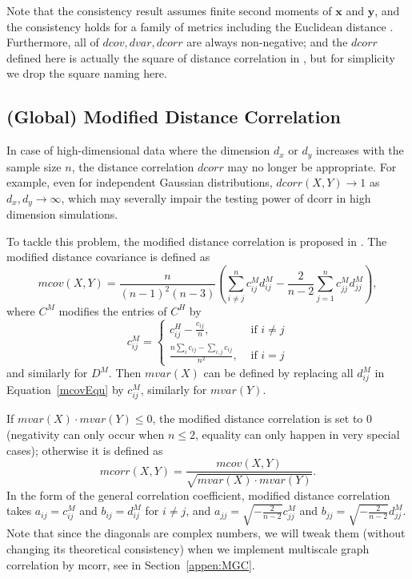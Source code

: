 \documentclass[11pt]{article}
\providecommand{\mb}[1]{\boldsymbol{#1}}
\begin{document}
Note that the consistency result assumes finite second moments of $\mb{x}$ and $\mb{y}$, and the consistency holds for a family of metrics including the Euclidean distance \cite{Lyons2013}. Furthermore, all of $dcov, dvar, dcorr$ are always non-negative; and the $dcorr$ defined here is actually the square of distance correlation in \cite{SzekelyRizzoBakirov2007}, but for simplicity we drop the square naming here.

\subsection{(Global) Modified Distance Correlation}
\label{appen:mcorr}
In case of high-dimensional data where the dimension $d_{x}$ or $d_{y}$ increases with the sample size $n$, the distance correlation $dcorr$ may no longer be appropriate. For example, even for independent Gaussian distributions, $dcorr(X,Y) \rightarrow 1$ as $d_{x}, d_{y} \rightarrow \infty$, which may severally impair the testing power of dcorr in high dimension simulations.

To tackle this problem, the modified distance correlation is proposed in \cite{SzekelyRizzo2013a}. The modified distance covariance is defined as
\begin{equation}
\label{mcovEqu}
mcov(X,Y)=\frac{n}{(n-1)^2(n-3)}(\sum_{i \neq j}^{n}c^{M}_{ij}d^{M}_{ij}-\frac{2}{n-2}\sum_{j=1}^{n}c^{M}_{jj}d^{M}_{jj}),
\end{equation}
where $C^{M}$ modifies the entries of $C^{H}$ by
\[c^{M}_{ij} = \left\{
  \begin{array}{lr}
    c^{H}_{ij}-\frac{c_{ij}}{n}, & \mbox{ if } i \neq j \\
    \frac{n\sum_{i}c_{ij}-\sum_{i,j}c_{ij}}{n^2}, &\mbox{ if } i = j 
  \end{array}
\right.
\]
and similarly for $D^{M}$. Then $mvar(X)$ can be defined by replacing all $d^{M}_{ij}$ in Equation~\eqref{mcovEqu} by $c^{M}_{ij}$, similarly for $mvar(Y)$. 

If $mvar(X) \cdot mvar(Y) \leq 0$, the modified distance correlation is set to $0$ (negativity can only occur when $n\leq 2$, equality can only happen in very special cases); otherwise it is defined as
\begin{equation}
\label{mcorrEqu}
mcorr(X,Y)=\frac{mcov(X,Y)}{\sqrt{mvar(X) \cdot mvar(Y)}}.
\end{equation}
In the form of the general correlation coefficient, modified distance correlation takes $a_{ij}=c^{M}_{ij}$ and $b_{ij}=d^{M}_{ij}$ for $i \neq j$, and $a_{jj}=\sqrt{-\frac{2}{n-2}}c^{M}_{jj}$ and $b_{jj}=\sqrt{-\frac{2}{n-2}}d^{M}_{jj}$. Note that since the diagonals are complex numbers, we will tweak them (without changing its theoretical consistency) when we implement multiscale graph correlation by mcorr, see in Section~\ref{appen:MGC}.
\end{document}
